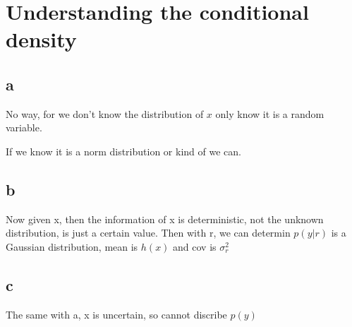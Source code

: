 \section{Understanding the conditional density}
\subsection{a}
No way, for we don't know the distribution of $ x $ only know it is a random variable.

If we know it is a norm distribution or kind of we can.

\subsection{b}

Now given x, then the information of x is deterministic, not the unknown distribution, is just a certain value. Then with r, we can determin $ p(y|r) $ is a Gaussian distribution, mean is $h(x)$ and cov is $ \sigma^2_r $

\subsection{c}

The same with a, x is uncertain, so cannot discribe $ p(y) $